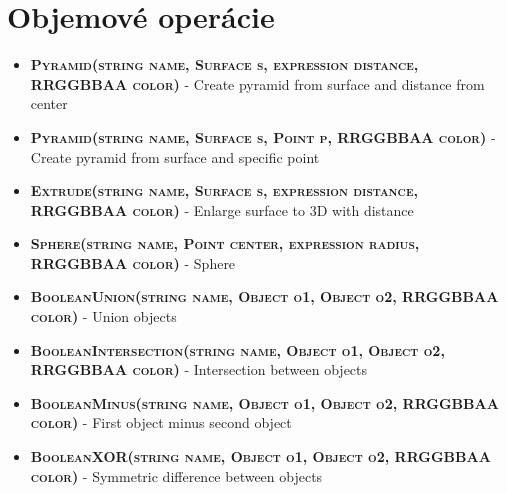 \section*{Objemové operácie}

\begin{itemize}
\item \textsc{\textbf{Pyramid(string name, Surface s, expression distance, RRGGBBAA color)}} - Create pyramid from surface and distance from center

\item \textsc{\textbf{Pyramid(string name, Surface s, Point p, RRGGBBAA color)}} - Create pyramid from surface and specific point

\item \textsc{\textbf{Extrude(string name, Surface s, expression distance, RRGGBBAA color)}}  - Enlarge surface to 3D with distance


\item \textsc{\textbf{Sphere(string name, Point center, expression radius, RRGGBBAA color)}} - Sphere

\item \textsc{\textbf{BooleanUnion(string name, Object o1, Object o2, RRGGBBAA color)}} - Union objects
\item \textsc{\textbf{BooleanIntersection(string name, Object o1, Object o2, RRGGBBAA color)}} - Intersection between objects
\item \textsc{\textbf{BooleanMinus(string name, Object o1, Object o2, RRGGBBAA color)}} - First object minus second object
\item \textsc{\textbf{BooleanXOR(string name, Object o1, Object o2, RRGGBBAA color)}} - Symmetric difference between objects
\end{itemize}